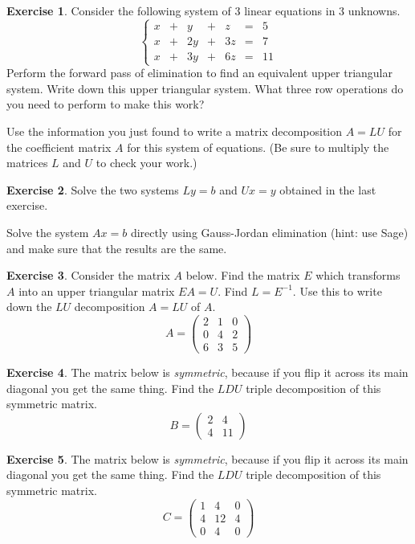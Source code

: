 \documentclass[11pt]{amsart}
\theoremstyle{definition}
\newtheorem{exercise}{Exercise}
\begin{document}
\begin{exercise}
Consider the following system of 3 linear equations in 3 unknowns.
\[\left\{
\begin{array}{rrrrrrr}
x & + & y & + & z & = & 5 \\
x & + & 2y & + & 3z & = & 7 \\
x & + & 3y & + & 6z & = & 11
\end{array}\right.
\]
Perform the forward pass of elimination to find an equivalent upper triangular system. Write down this upper triangular system. What three row operations do you need to perform to make this work?

Use the information you just found to write a matrix decomposition $A = LU$ for the coefficient matrix $A$ for this system of equations. (Be sure to multiply the matrices $L$ and $U$ to check your work.)

\end{exercise}

\begin{exercise}
Solve the two systems $Ly = b$ and $Ux=y$ obtained in the last exercise.

Solve the system $Ax=b$ directly using Gauss-Jordan elimination (hint: use Sage) and make sure that the results are the same.
\end{exercise}

\begin{exercise}
Consider the matrix $A$ below. Find the matrix $E$ which transforms $A$ into an upper triangular matrix $EA = U$. Find $L = E^{-1}$. Use this to write down the $LU$ decomposition $A= LU$ of $A$.
\[
A =
\begin{pmatrix}
2 & 1 & 0 \\
0 & 4 & 2 \\
6 & 3 & 5
\end{pmatrix}
\]
\end{exercise}

\begin{exercise}
The matrix below is \emph{symmetric}, because if you flip it across its main diagonal you get the same thing. Find the $LDU$ triple decomposition of this symmetric matrix.
\[
B =
\begin{pmatrix}
2 & 4 \\
4 & 11
\end{pmatrix}
\]
\end{exercise}

\begin{exercise}
The matrix below is \emph{symmetric}, because if you flip it across its main diagonal you get the same thing. Find the $LDU$ triple decomposition of this symmetric matrix.
\[
C =
\begin{pmatrix}
1 & 4 & 0 \\
4 & 12 & 4 \\
0 & 4 & 0
\end{pmatrix}
\]

\end{exercise}
\end{document}
